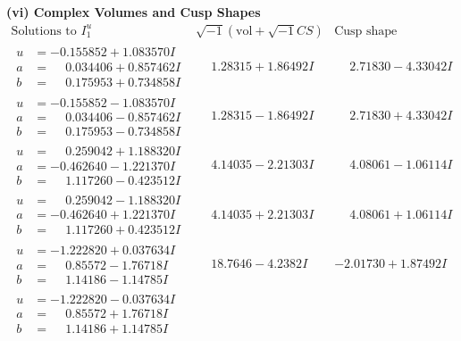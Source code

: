 \documentclass[1p]{elsarticle_modified}
\theoremstyle{definition}
\newcommand{\I}{\sqrt{-1}}
\begin{document}
\newpage\flushleft \textbf{(vi) Complex Volumes and Cusp Shapes}
$$\begin{array}{c|c|c}  
\text{Solutions to }I^u_{1}& \I (\text{vol} + \sqrt{-1}CS) & \text{Cusp shape}\\
 \hline 
\begin{aligned}
u &= -0.155852 + 1.083570 I \\
a &= \phantom{-}0.034406 + 0.857462 I \\
b &= \phantom{-}0.175953 + 0.734858 I\end{aligned}
 & \phantom{-}1.28315 + 1.86492 I & \phantom{-}2.71830 - 4.33042 I \\ \hline\begin{aligned}
u &= -0.155852 - 1.083570 I \\
a &= \phantom{-}0.034406 - 0.857462 I \\
b &= \phantom{-}0.175953 - 0.734858 I\end{aligned}
 & \phantom{-}1.28315 - 1.86492 I & \phantom{-}2.71830 + 4.33042 I \\ \hline\begin{aligned}
u &= \phantom{-}0.259042 + 1.188320 I \\
a &= -0.462640 - 1.221370 I \\
b &= \phantom{-}1.117260 - 0.423512 I\end{aligned}
 & \phantom{-}4.14035 - 2.21303 I & \phantom{-}4.08061 - 1.06114 I \\ \hline\begin{aligned}
u &= \phantom{-}0.259042 - 1.188320 I \\
a &= -0.462640 + 1.221370 I \\
b &= \phantom{-}1.117260 + 0.423512 I\end{aligned}
 & \phantom{-}4.14035 + 2.21303 I & \phantom{-}4.08061 + 1.06114 I \\ \hline\begin{aligned}
u &= -1.222820 + 0.037634 I \\
a &= \phantom{-}0.85572 - 1.76718 I \\
b &= \phantom{-}1.14186 - 1.14785 I\end{aligned}
 & \phantom{-}18.7646 - 4.2382 I & -2.01730 + 1.87492 I \\ \hline\begin{aligned}
u &= -1.222820 - 0.037634 I \\
a &= \phantom{-}0.85572 + 1.76718 I \\
b &= \phantom{-}1.14186 + 1.14785 I\end{aligned}

\end{array}$$
\end{document}
